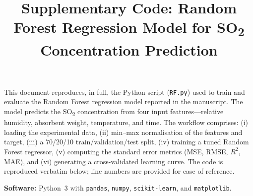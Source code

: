 \documentclass[11pt]{article}
\title{\vspace{-1.5em}\textbf{Supplementary Code: Random Forest Regression Model for SO\textsubscript{2} Concentration Prediction}}
\author{}
\date{}
\begin{document}
\maketitle
\thispagestyle{fancy}
\vspace{-3em}

\noindent
This document reproduces, in full, the Python script (\texttt{RF.py}) used to
train and evaluate the Random Forest regression model reported in the
manuscript. The model predicts the SO\textsubscript{2} concentration from four
input features---relative humidity, absorbent weight, temperature, and
time. The workflow comprises: (i) loading the experimental data, (ii)
min--max normalisation of the features and target, (iii) a 70/20/10
train/validation/test split, (iv) training a tuned Random Forest regressor,
(v) computing the standard error metrics (MSE, RMSE, $R^2$, MAE), and
(vi) generating a cross-validated learning curve. The code is reproduced
verbatim below; line numbers are provided for ease of reference.

\vspace{0.5em}
\noindent\textbf{Software:} Python~3 with \texttt{pandas}, \texttt{numpy},
\texttt{scikit-learn}, and \texttt{matplotlib}.

\vspace{1em}


\end{document}
